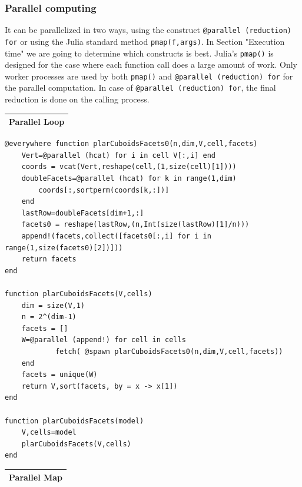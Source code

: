 \documentclass{article}
\begin{document}
\subsubsection{Parallel computing}
\vspace{1ex}
It can be parallelized in two ways, using the construct \texttt{@parallel (reduction) for} or using the Julia standard method \texttt{pmap(f,args)}.
In Section "Execution time" we are going to determine which constructs is best.
Julia's \texttt{pmap()} is designed for the case where each function call does a large amount of work. Only worker processes are used by both  \texttt{pmap()} and \texttt{@parallel (reduction) for} for the parallel computation. In case of \texttt{@parallel (reduction) for}, the final reduction is done on the calling process.
\vspace{2ex}
\begin{flushleft} \small
\begin{center}
\begin{tabular}{|p{16cm}|}
\hline
\cellcolor[gray]{.9}Parallel Loop\\
\hline
\end{tabular}
\end{center}
\vspace{2ex}
\begin{list}{}{} \item
   \begin{Verbatim}[tabsize=4]
@everywhere function plarCuboidsFacets0(n,dim,V,cell,facets)
	Vert=@parallel (hcat) for i in cell V[:,i] end
	coords = vcat(Vert,reshape(cell,(1,size(cell)[1])))
	doubleFacets=@parallel (hcat) for k in range(1,dim)
		coords[:,sortperm(coords[k,:])] 
	end
	lastRow=doubleFacets[dim+1,:]
	facets0 = reshape(lastRow,(n,Int(size(lastRow)[1]/n)))
	append!(facets,collect([facets0[:,i] for i in range(1,size(facets0)[2])]))
	return facets
end

function plarCuboidsFacets(V,cells)
	dim = size(V,1)
	n = 2^(dim-1)
	facets = []
	W=@parallel (append!) for cell in cells
			fetch( @spawn plarCuboidsFacets0(n,dim,V,cell,facets))
	end
	facets = unique(W)
	return V,sort(facets, by = x -> x[1])
end

function plarCuboidsFacets(model)
    V,cells=model
    plarCuboidsFacets(V,cells)
end
   \end{Verbatim}
\end{list}
\vspace{2ex}


\begin{center}
\begin{tabular}{|p{16cm}|}
\hline
\cellcolor[gray]{.9}Parallel Map\\
\hline
\end{tabular}
\end{center}
\vspace{2ex}


\end{flushleft}
\end{document}
